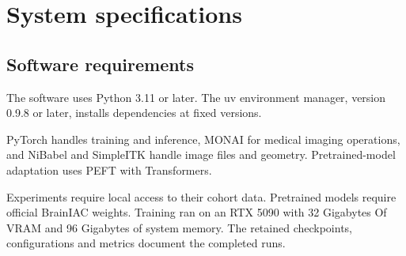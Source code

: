 \clearpage
\chapter{System specifications}

\section{Software requirements}

The software uses Python 3.11 or later. The uv environment manager, version 0.9.8 or later, installs dependencies at fixed versions.

PyTorch handles training and inference, MONAI for medical imaging operations, and NiBabel and SimpleITK handle image files and geometry. Pretrained-model adaptation uses PEFT with Transformers.

Experiments require local access to their cohort data. Pretrained models require official BrainIAC weights. Training ran on an RTX 5090 with 32 Gigabytes Of VRAM and 96 Gigabytes of system memory. The retained checkpoints, configurations and metrics document the completed runs.
